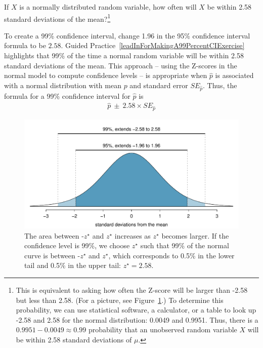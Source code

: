 \begin{exercise} \label{leadInForMakingA99PercentCIExercise}
If $X$ is a normally distributed random variable, how often will $X$
be within 2.58 standard deviations of the mean?\footnote{This is
equivalent to asking how often the Z-score will be larger than -2.58
but less than 2.58. (For a picture, see Figure~\ref{choosingZForCI}.)
To determine this probability, we can use statistical software,
a calculator, or a table to look up -2.58 and 2.58 for the normal
distribution: 0.0049 and 0.9951. Thus, there is a
$0.9951-0.0049 \approx 0.99$ probability that an unobserved random
variable $X$ will be within 2.58 standard deviations of $\mu$.}
\end{exercise}

To create a 99\% confidence interval, change 1.96 in the 95\%
confidence interval formula to be $2.58$. Guided Practice~\ref{leadInForMakingA99PercentCIExercise} highlights
that 99\% of the time a normal random variable will be within
2.58 standard deviations of the mean. This approach -- using
the Z-scores in the normal model to compute confidence levels -- is
appropriate when $\hat{p}$ is associated with a normal distribution
with mean $p$ and standard error $SE_{\hat{p}}$. Thus, the formula
for a 99\% confidence interval for $\hat{p}$ is
\begin{eqnarray}
\hat{p}\ \pm\ 2.58\times SE_{\hat{p}}
\label{99PercCIForProp}
\end{eqnarray}

\begin{figure}
  \centering
  \includegraphics[width=\textwidth]{ch_inference_for_props/figures/choosingZForCI/choosingZForCI}
  \caption{The area between -$z^{\star}$ and $z^{\star}$ increases as
      $z^{\star}$ becomes larger. If the confidence level is 99\%,
      we choose $z^{\star}$ such that 99\% of the normal curve is
      between -$z^{\star}$ and $z^{\star}$, which corresponds to 0.5\%
      in the lower tail and 0.5\% in the upper tail: $z^{\star}=2.58$.}
\label{choosingZForCI}
\end{figure}

